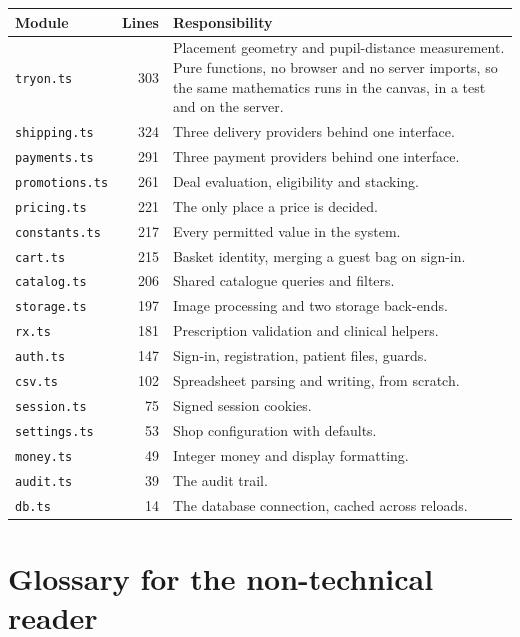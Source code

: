 \documentclass[11pt,a4paper]{report}
\newcommand{\code}[1]{\texttt{\small #1}}
\begin{document}
\begin{longtable}{@{}p{}r p{}@{}}
\toprule
\textbf{Module} & \textbf{Lines} & \textbf{Responsibility}\\
\midrule
\endhead
\code{tryon.ts} & 303 & Placement geometry and pupil-distance measurement.
Pure functions, no browser and no server imports, so the same mathematics runs
in the canvas, in a test and on the server.\\
\code{shipping.ts} & 324 & Three delivery providers behind one interface.\\
\code{payments.ts} & 291 & Three payment providers behind one interface.\\
\code{promotions.ts} & 261 & Deal evaluation, eligibility and stacking.\\
\code{pricing.ts} & 221 & The only place a price is decided.\\
\code{constants.ts} & 217 & Every permitted value in the system.\\
\code{cart.ts} & 215 & Basket identity, merging a guest bag on sign-in.\\
\code{catalog.ts} & 206 & Shared catalogue queries and filters.\\
\code{storage.ts} & 197 & Image processing and two storage back-ends.\\
\code{rx.ts} & 181 & Prescription validation and clinical helpers.\\
\code{auth.ts} & 147 & Sign-in, registration, patient files, guards.\\
\code{csv.ts} & 102 & Spreadsheet parsing and writing, from scratch.\\
\code{session.ts} & 75 & Signed session cookies.\\
\code{settings.ts} & 53 & Shop configuration with defaults.\\
\code{money.ts} & 49 & Integer money and display formatting.\\
\code{audit.ts} & 39 & The audit trail.\\
\code{db.ts} & 14 & The database connection, cached across reloads.\\
\bottomrule
\end{longtable}

\chapter{Glossary for the non-technical reader}
\end{document}
